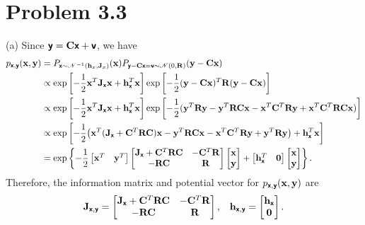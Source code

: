 \documentclass{article}
\newcommand{\bs}[1]{\textsf{\textbf{#1}}}
\newcommand{\bm}{\mathbf}
\begin{document}
\section*{Problem 3.3}
(a) Since $\bs{y} = \bm{C}\bs{x} + \bs{v}$, we have
\begin{align*}
p_{\bs{x}, \bs{y}}(\bm{x}, \bm{y}) &=
P_{\bs{x}\sim\mathscr{N}^{-1}(\bm{h}_x, \bm{J}_x)}(\bm{x})P_{\bs{y}-\bm{C}\bs{x}
=\bs{v}\sim\mathscr{N}(0,\bm{R})}(\bm{y}-\bm{C}\bm{x})\\
&\propto\exp\left[-\frac{1}{2}\bm{x}^T\bm{J}_{\bs{x}}\bm{x}+\bm{h}_\bs{x}^T\bm{x}\right]
\exp\left[-\frac{1}{2}(\bm{y}-\bm{C}\bm{x})^T\bm{R}(\bm{y}-\bm{C}\bm{x})\right]\\
&\propto\exp\left[-\frac{1}{2}\bm{x}^T\bm{J}_{\bs{x}}\bm{x}+\bm{h}_\bs{x}^T\bm{x}\right]
\exp\left[-\frac{1}{2}(\bm{y}^T\bm{R}\bm{y} - \bm{y}^T\bm{R}\bm{C}\bm{x} - \bm{x}^T\bm{C}^T\bm{R}\bm{y}
+ \bm{x}^T\bm{C}^T\bm{R}\bm{C}\bm{x})\right]\\
&\propto\exp\left[-\frac{1}{2}\big(
\bm{x}^T(\bm{J}_\bs{x}+\bm{C}^T\bm{R}\bm{C})\bm{x}
- \bm{y}^T\bm{R}\bm{C}\bm{x}
-\bm{x}^T\bm{C}^T\bm{R}\bm{y}
+\bm{y}^T\bm{R}\bm{y}\big)
+ \bm{h}_\bs{x}^T\bm{x}\right]\\
& = \exp\left\{
-\frac{1}{2}
\begin{bmatrix}
    \bm{x}^T & \bm{y}^T
\end{bmatrix}
\begin{bmatrix}
    \bm{J}_\bs{x}+\bm{C}^T\bm{R}\bm{C} & -\bm{C}^T\bm{R} \\
    -\bm{R}\bm{C} & \bm{R}
\end{bmatrix}
\begin{bmatrix}
    \bm{x} \\
    \bm{y}
\end{bmatrix}
+ 
\begin{bmatrix}
    \bm{h}_{\bs{x}}^T & \bm{0}
\end{bmatrix}
\begin{bmatrix}
    \bm{x} \\
    \bm{y}
\end{bmatrix}
\right\}.
\end{align*}
Therefore, the information matrix and potential vector for $p_{\bs{x}, \bs{y}}(\bm{x}, \bm{y})$ are
\begin{align*}
	\bm{J}_{\bs{x}, \bs{y}} = \begin{bmatrix}
    \bm{J}_\bs{x}+\bm{C}^T\bm{R}\bm{C} & -\bm{C}^T\bm{R} \\
    -\bm{R}\bm{C} & \bm{R}
\end{bmatrix},\;\;\;
\bm{h}_{\bs{x}, \bs{y}} = 
\begin{bmatrix}
    \bm{h}_{\bs{x}} \\
    \bm{0}
\end{bmatrix}.
\end{align*}
\end{document}
